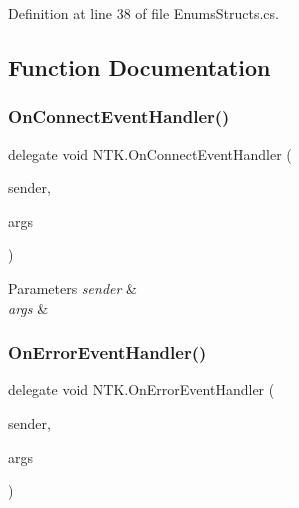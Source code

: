 Definition at line 38 of file Enums\+Structs.\+cs.



\subsection{Function Documentation}
\mbox{\label{namespace_n_t_k_a8743f7b779ee57a52d3757cd46ea0060}} 
\subsubsection{\texorpdfstring{OnConnectEventHandler()}{OnConnectEventHandler()}}
{\footnotesize\ttfamily delegate void N\+T\+K.\+On\+Connect\+Event\+Handler (\begin{DoxyParamCaption}\item[{object}]{sender,  }\item[{\mbox{\hyperlink{class_n_t_k_1_1_events_args_1_1_on_connect_event_args}{On\+Connect\+Event\+Args}}}]{args }\end{DoxyParamCaption})}






\begin{DoxyParams}{Parameters}
{\em sender} & \\
\hline
{\em args} & \\
\hline
\end{DoxyParams}
\mbox{\label{namespace_n_t_k_a41f1f90439f13a48e64026ed730a1df8}} 
\subsubsection{\texorpdfstring{OnErrorEventHandler()}{OnErrorEventHandler()}}
{\footnotesize\ttfamily delegate void N\+T\+K.\+On\+Error\+Event\+Handler (\begin{DoxyParamCaption}\item[{object}]{sender,  }\item[{\mbox{\hyperlink{class_n_t_k_1_1_events_args_1_1_on_error_event_args}{On\+Error\+Event\+Args}}}]{args }\end{DoxyParamCaption})}






